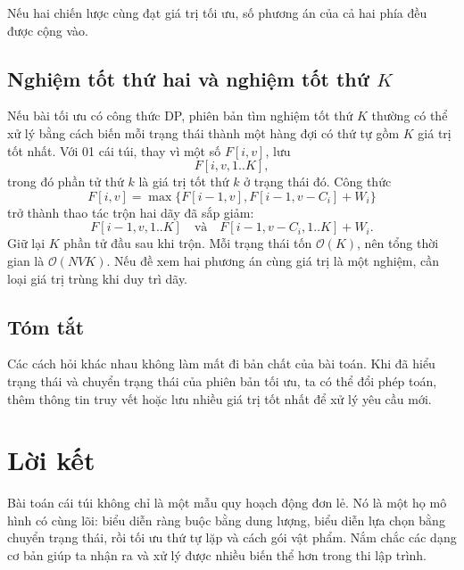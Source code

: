 \documentclass[11pt]{article}
\newcommand{\Oh}{\mathcal{O}}
\begin{document}
Nếu hai chiến lược cùng đạt giá trị tối ưu, số phương án của cả hai phía đều
được cộng vào.

\subsection{Nghiệm tốt thứ hai và nghiệm tốt thứ \texorpdfstring{\(K\)}{K}}

Nếu bài tối ưu có công thức DP, phiên bản tìm nghiệm tốt thứ \(K\) thường có
thể xử lý bằng cách biến mỗi trạng thái thành một hàng đợi có thứ tự gồm \(K\)
giá trị tốt nhất. Với 01 cái túi, thay vì một số \(F[i,v]\), lưu
\[
  F[i,v,1..K],
\]
trong đó phần tử thứ \(k\) là giá trị tốt thứ \(k\) ở trạng thái đó. Công thức
\[
  F[i,v]=\max\{F[i-1,v],F[i-1,v-C_i]+W_i\}
\]
trở thành thao tác trộn hai dãy đã sắp giảm:
\[
  F[i-1,v,1..K]
  \quad\text{và}\quad
  F[i-1,v-C_i,1..K]+W_i.
\]
Giữ lại \(K\) phần tử đầu sau khi trộn. Mỗi trạng thái tốn \(\Oh(K)\), nên
tổng thời gian là \(\Oh(NVK)\). Nếu đề xem hai phương án cùng giá trị là một
nghiệm, cần loại giá trị trùng khi duy trì dãy.

\subsection{Tóm tắt}

Các cách hỏi khác nhau không làm mất đi bản chất của bài toán. Khi đã hiểu
trạng thái và chuyển trạng thái của phiên bản tối ưu, ta có thể đổi phép toán,
thêm thông tin truy vết hoặc lưu nhiều giá trị tốt nhất để xử lý yêu cầu mới.

\section*{Lời kết}

Bài toán cái túi không chỉ là một mẫu quy hoạch động đơn lẻ. Nó là một họ mô
hình có cùng lõi: biểu diễn ràng buộc bằng dung lượng, biểu diễn lựa chọn bằng
chuyển trạng thái, rồi tối ưu thứ tự lặp và cách gói vật phẩm. Nắm chắc các
dạng cơ bản giúp ta nhận ra và xử lý được nhiều biến thể hơn trong thi lập
trình.
\end{document}
